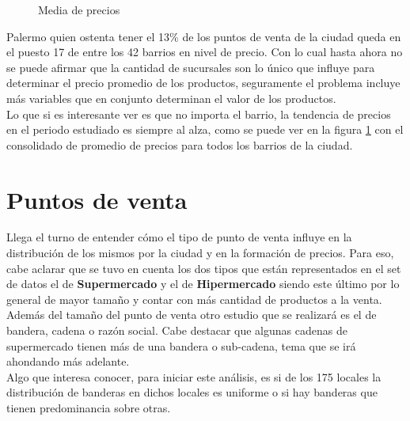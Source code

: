 \begin{figure}
\centering
{}%
\caption{Media de precios}
\label{media_precios}
\end{figure}

Palermo quien ostenta tener el 13\%  de los puntos de venta de la ciudad queda en el puesto 17 de entre los 42 barrios en nivel de precio. Con lo cual hasta ahora no se puede afirmar que la cantidad de sucursales son lo único que influye para determinar el precio promedio de los productos, seguramente el problema incluye más variables que en conjunto determinan el valor de los productos.\\
Lo que si es interesante ver es que no importa el barrio, la tendencia de precios en el periodo estudiado es siempre al alza, como se puede ver en la figura \ref{media_precios} con el consolidado de promedio de precios para todos los barrios de la ciudad.\\


\section{Puntos de venta}

Llega el turno de entender cómo el tipo de punto de venta influye en la distribución de los mismos por la ciudad y en la formación de precios. Para eso, cabe aclarar que se tuvo en cuenta los dos tipos que están representados en el set de datos el de \textbf{Supermercado} y el de \textbf{Hipermercado} siendo este último por lo general de mayor tamaño y contar con más cantidad de productos a la venta. 
Además del tamaño del punto de venta otro estudio que se realizará es el de bandera, cadena o razón social. Cabe destacar que algunas cadenas de supermercado tienen más de una bandera o sub-cadena, tema que se irá ahondando más adelante.\\
Algo que interesa conocer, para iniciar este análisis, es si de los 175 locales la distribución de banderas en dichos locales es uniforme o si hay banderas que tienen predominancia sobre otras.


